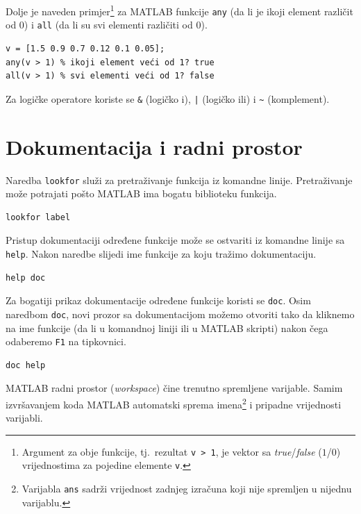 \documentclass[a4paper, 10pt]{article}
\newcommand{\spec}[1]{\texttt{#1}} %
\newcommand{\eng}[1]{\emph{#1}} %
\begin{document}
Dolje je naveden primjer\footnote{Argument za obje funkcije, tj.\ rezultat \spec{v > 1}, je vektor sa \eng{true}/\eng{false} ($1$/$0$) vrijednostima za pojedine elemente \spec{v}.}
za MATLAB funkcije \spec{any} (da li je ikoji element različit od $0$) i \spec{all} (da li su svi elementi različiti od $0$).

\begin{lstlisting}
v = [1.5 0.9 0.7 0.12 0.1 0.05];
any(v > 1) % ikoji element veći od 1? true
all(v > 1) % svi elementi veći od 1? false
\end{lstlisting}

Za logičke operatore koriste se \spec{\&} (logičko i), \spec{|} (logičko ili) i \spec{\textasciitilde} (komplement).


\section{Dokumentacija i radni prostor}

Naredba \spec{lookfor} služi za pretraživanje funkcija iz komandne linije.
Pretraživanje može potrajati pošto MATLAB ima bogatu biblioteku funkcija.

\begin{lstlisting}
lookfor label
\end{lstlisting}

Pristup dokumentaciji određene funkcije može se ostvariti iz komandne linije sa \spec{help}.
Nakon naredbe slijedi ime funkcije za koju tražimo dokumentaciju.

\begin{lstlisting}
help doc
\end{lstlisting}

Za bogatiji prikaz dokumentacije određene funkcije koristi se \spec{doc}.
Osim naredbom \spec{doc}, novi prozor sa dokumentacijom možemo otvoriti tako da kliknemo na ime funkcije (da li u komandnoj liniji ili u MATLAB skripti) nakon čega odaberemo \spec{F1} na tipkovnici.

\begin{lstlisting}
doc help
\end{lstlisting}

MATLAB radni prostor (\eng{workspace}) čine trenutno spremljene varijable.
Samim izvršavanjem koda MATLAB automatski sprema imena\footnote{Varijabla \spec{ans} sadrži vrijednost zadnjeg izračuna koji nije spremljen u nijednu varijablu.} i pripadne vrijednosti varijabli.
\end{document}
